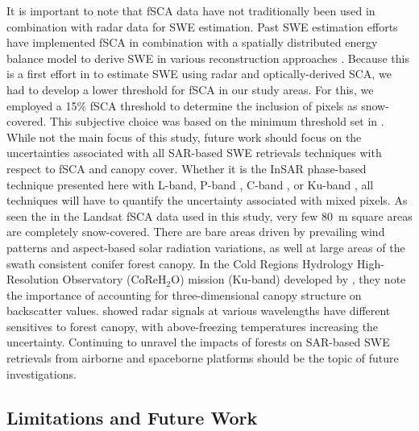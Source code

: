 It is important to note that fSCA data have not traditionally been used in combination with radar data for SWE estimation. Past SWE estimation efforts have implemented fSCA in combination with a spatially distributed energy balance model to derive SWE in various reconstruction approaches \citep{clineEstimatingSpatialDistribution1998,molotchEstimatingDistributionSnow2008,rittgerSpatialEstimatesSnow2016,margulisLandsatEraSierraNevada2016}. Because this is a first effort in to estimate SWE using radar and optically-derived SCA, we had to develop a lower threshold for fSCA in our study areas. For this, we employed a 15\% fSCA threshold to determine the inclusion of pixels as snow-covered. This subjective choice was based on the minimum threshold set in \cite{painterRetrievalSubpixelSnow2009}. While not the main focus of this study, future work should focus on the uncertainties associated with all SAR-based SWE retrievals techniques with respect to fSCA and canopy cover. Whether it is the InSAR phase-based technique presented here with L-band, P-band \citep{shahRemoteSensingSnow2017,maEstimatingSpatiotemporallyContinuous2023}, C-band \citep{lievensSnowDepthVariability2019,oveisgharanSnowWaterEquivalent2023}, or Ku-band \citep{tsangReviewArticleGlobal2022,rottColdRegionsHydrology2010}, all techniques will have to quantify the uncertainty associated with mixed pixels. As seen the in the Landsat fSCA data used in this study, very few 80~m square areas are completely snow-covered. There are bare areas driven by prevailing wind patterns and aspect-based solar radiation variations, as well at large areas of the swath consistent conifer forest canopy. In the Cold Regions Hydrology High-Resolution Observatory (CoReH$_{2}$O) mission (Ku-band) developed by \cite{rottColdRegionsHydrology2010}, they note the importance of accounting for three-dimensional canopy structure on backscatter values. \cite{lemmetyinenAttenuationRadarSignal2022} showed radar signals at various wavelengths have different sensitives to forest canopy, with above-freezing temperatures increasing the uncertainty. Continuing to unravel the impacts of forests on SAR-based SWE retrievals from airborne and spaceborne platforms should be the topic of future investigations.


\hypertarget{ch5-discussion-2}{\subsection{Limitations and Future Work}\label{ch4-discussion-2}}

